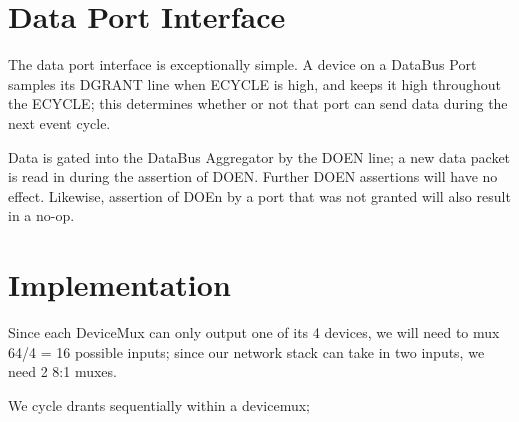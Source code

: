 \section{Data Port Interface}

The data port interface is exceptionally simple. A device on a DataBus
Port samples its DGRANT line when ECYCLE is high, and keeps it high
throughout the ECYCLE; this determines whether or not that port can
send data during the next event cycle.

Data is gated into the DataBus Aggregator by the DOEN line; a new data
packet is read in during the assertion of DOEN. Further DOEN
assertions will have no effect. Likewise, assertion of DOEn by a port
that was not granted will also result in a no-op. 

\section{Implementation}

Since each DeviceMux can only output one of its 4 devices, we will
need to mux 64/4 = 16 possible inputs; since our network stack can
take in two inputs, we need 2 8:1 muxes.

We cycle drants sequentially within a devicemux; 

